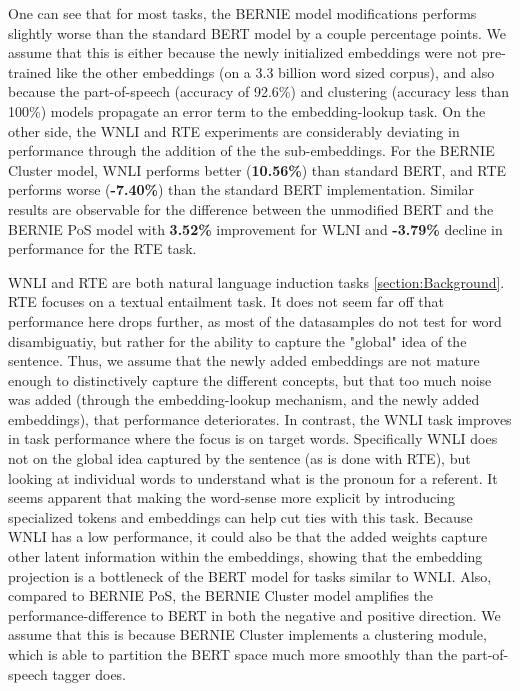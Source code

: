 \documentclass[a4paper,12pt,oneside,openright]{report}
\begin{document}
One can see that for most tasks, the BERNIE model modifications performs slightly worse than the standard BERT model by a couple percentage points.
We assume that this is either because the newly initialized embeddings were not pre-trained like the other embeddings (on a 3.3 billion word sized corpus), and also because the part-of-speech (accuracy of 92.6\%) and clustering (accuracy less than 100\%) models propagate an error term to the embedding-lookup task.
On the other side, the WNLI and RTE experiments are considerably deviating in performance through the addition of the the sub-embeddings.
For the BERNIE Cluster model, WNLI performs better (\textbf{10.56\%}) than standard BERT, and RTE performs worse  (\textbf{-7.40\%}) than the standard BERT implementation.
Similar results are observable for the difference between the unmodified BERT and the BERNIE PoS model with \textbf{3.52\%} improvement for WLNI and \textbf{-3.79\%} decline in performance for the RTE task.

WNLI and RTE are both natural language induction tasks \ref{section:Background}.
RTE focuses on a textual entailment task. 
It does not seem far off that performance here drops further, as most of the datasamples do not test for word disambiguatiy, but rather for the ability to capture the "global" idea of the sentence.
Thus, we assume that the newly added embeddings are not mature enough to distinctively capture the different concepts, but that too much noise was added (through the embedding-lookup mechanism, and the newly added embeddings), that performance deteriorates.
In contrast, the WNLI task improves in task performance where the focus is on target words. 
Specifically WNLI does not on the global idea captured by the sentence (as is done with RTE), but looking at individual words to understand what is the pronoun for a referent.
It seems apparent that making the word-sense more explicit by introducing specialized tokens and embeddings can help cut ties with this task.
Because WNLI has a low performance, it could also be that the added weights capture other latent information within the embeddings, showing that the embedding projection is a bottleneck of the BERT model for tasks similar to WNLI.
Also, compared to BERNIE PoS, the BERNIE Cluster model amplifies the performance-difference to BERT in both the negative and positive direction.
We assume that this is because BERNIE Cluster implements a clustering module, which is able to partition the BERT space much more smoothly than the part-of-speech tagger does.
\end{document}
